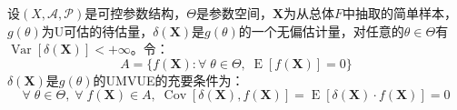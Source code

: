 \begin{theorem}\label{theo:UMVUE0UnbiasedEstimation}
	设$(X,\mathscr{A},\mathscr{P})$是可控参数结构，$\Theta$是参数空间，$\mathbf{X}$为从总体$F$中抽取的简单样本，$g(\theta)$为U可估的待估量，$\delta(\mathbf{X})$是$g(\theta)$的一个无偏估计量，对任意的$\theta\in\Theta$有$\operatorname{Var}[\delta(\mathbf{X})]<+\infty$。令：
	\begin{equation*}
		A=\{f(\mathbf{X}):\forall\;\theta\in\Theta,\;\operatorname{E}[f(\mathbf{X})]=0\}
	\end{equation*}
	$\delta(\mathbf{X})$是$g(\theta)$的UMVUE的充要条件为：
	\begin{equation*}
		\forall\;\theta\in\Theta,\;\forall\;f(\mathbf{X})\in A,\;\operatorname{Cov}[\delta(\mathbf{X}),f(\mathbf{X})]=\operatorname{E}[\delta(\mathbf{X})\cdot f(\mathbf{X})]=0
	\end{equation*}
\end{theorem}
